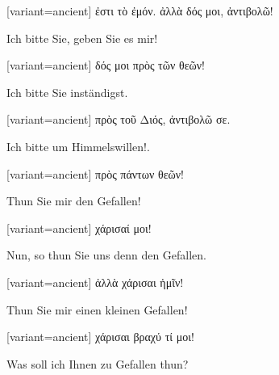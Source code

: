 \begin{greek}[variant=ancient]%
ἐστι τὸ ἐμόν. ἀλλὰ δός μοι, ἀντιβολῶ!

\end{greek}%
\switchcolumn*

Ich bitte Sie, geben Sie es mir!

\switchcolumn

\begin{greek}[variant=ancient]%
δός μοι πρὸς τῶν θεῶν!

\end{greek}%
\switchcolumn*

Ich bitte Sie inständigst.

\switchcolumn

\begin{greek}[variant=ancient]%
πρὸς τοῦ Διός, ἀντιβολῶ σε.

\end{greek}%
\switchcolumn*

Ich bitte um Himmels\textcompwordmark{}willen!.

\switchcolumn

\begin{greek}[variant=ancient]%
πρὸς πάντων θεῶν!

\end{greek}%
\switchcolumn*

Thun Sie mir den Gefallen!

\switchcolumn

\begin{greek}[variant=ancient]%
χάρισαί μοι!

\end{greek}%
\switchcolumn*

Nun, so thun Sie uns denn den Gefallen.

\switchcolumn

\begin{greek}[variant=ancient]%
ἀλλὰ χάρισαι ἡμῖν!

\end{greek}%
\switchcolumn*

Thun Sie mir einen kleinen Gefallen!

\switchcolumn

\begin{greek}[variant=ancient]%
χάρισαι βραχύ τί μοι!

\end{greek}%
\switchcolumn*

Was soll ich Ihnen zu Gefallen thun?

\switchcolumn

